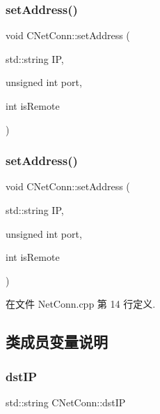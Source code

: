 \mbox{\label{class_c_net_conn_a9157b83f4f5d149487dadba775e53fa3}} 
\subsubsection{\texorpdfstring{set\+Address()}{setAddress()}\hspace{0.1cm}{\footnotesize\ttfamily [1/2]}}
{\footnotesize\ttfamily void C\+Net\+Conn\+::set\+Address (\begin{DoxyParamCaption}\item[{std\+::string}]{IP,  }\item[{unsigned int}]{port,  }\item[{int}]{is\+Remote }\end{DoxyParamCaption})}

\mbox{\label{class_c_net_conn_a9157b83f4f5d149487dadba775e53fa3}} 
\subsubsection{\texorpdfstring{set\+Address()}{setAddress()}\hspace{0.1cm}{\footnotesize\ttfamily [2/2]}}
{\footnotesize\ttfamily void C\+Net\+Conn\+::set\+Address (\begin{DoxyParamCaption}\item[{std\+::string}]{IP,  }\item[{unsigned int}]{port,  }\item[{int}]{is\+Remote }\end{DoxyParamCaption})}



在文件 Net\+Conn.\+cpp 第 14 行定义.



\subsection{类成员变量说明}
\mbox{\label{class_c_net_conn_a29e8c336b1ebcdec3d1867d2c8667d88}} 
\subsubsection{\texorpdfstring{dst\+IP}{dstIP}}
{\footnotesize\ttfamily std\+::string C\+Net\+Conn\+::dst\+IP}



